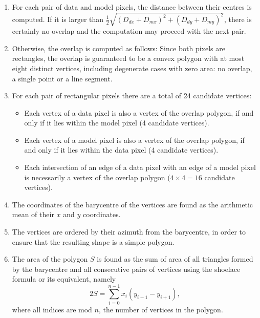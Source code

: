 \begin{enumerate}
    \item For each pair of data and model pixels, the distance between their centres is computed.
        If it is larger than $\frac{1}{2}\sqrt{\left(D_{dx} + D_{mx}\right)^2 + \left(D_{dy} + D_{my}\right)^2}$,
        there is certainly no overlap and the computation may proceed with the next pair.
    \item Otherwise, the overlap is computed as follows:
        Since both pixels are rectangles, the overlap is guaranteed to be a convex polygon
        with at most eight distinct vertices, including degenerate cases with zero
        area: no overlap, a single point or a line segment.
    \item For each pair of rectangular pixels there are a total of 24 candidate vertices:
        \begin{itemize}
            \item Each vertex of a data pixel is also a vertex of the overlap polygon,
                if and only if it lies within the model pixel (4 candidate vertices).
            \item Each vertex of a model pixel is also a vertex of the overlap polygon,
                if and only if it lies within the data pixel (4 candidate vertices).
            \item Each intersection of an edge of a data pixel with an edge of a model pixel
                is necessarily a vertex of the overlap polygon ($4 \times 4 = 16$ candidate vertices).
        \end{itemize}
    \item The coordinates of the barycentre of the vertices are found
        as the arithmetic mean of their $x$ and $y$ coordinates.
    \item The vertices are ordered by their azimuth from the barycentre,
        in order to ensure that the resulting shape is a simple polygon.
    \item The area of the polygon $S$ is found as the sum of area of all triangles
        formed by the barycentre and all consecutive pairs of vertices
        using the shoelace formula or its equivalent, namely
        \begin{equation}
            2S = \sum\limits_{i = 0}^{n - 1} x_i \left(y_{i - 1} - y_{i + 1}\right),
        \end{equation}
        where all indices are mod $n$, the number of vertices in the polygon.
\end{enumerate}

